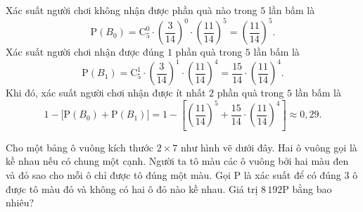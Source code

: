 \begin{ex}
{		Xác suất người chơi không nhận được phần quà nào trong $5$ lần bấm là
		\[\mathrm{P}(B_0) = \mathrm{C}_5^0\cdot \left(\dfrac{3}{14} \right)^0 \cdot \left(\dfrac{11}{14}\right)^5 = \left(\dfrac{11}{14} \right)^5. \]
		Xác suất người chơi nhận được đúng $1$ phần quà trong $5$ lần bấm là
		\[\mathrm{P}(B_1) = \mathrm{C}_5^1\cdot \left(\dfrac{3}{14}\right)^1 \cdot \left(\dfrac{11}{14} \right)^4 = \dfrac{15}{14}\cdot \left(\dfrac{11}{14}\right)^4. \]
		Khi đó, xác suất người chơi nhận được ít nhất $2$ phần quà trong $5$ lần bấm là
		\[1-\big[\mathrm{P}(B_0) + \mathrm{P}(B_1) \big] = 1- \left[\left(\dfrac{11}{14} \right)^5 + \dfrac{15}{14}\cdot \left(\dfrac{11}{14}\right)^4 \right] \approx 0{,}29. \]
	}
\end{ex}

\begin{ex}%
	Cho một bảng ô vuông kích thước $2\times7$ như hình vẽ dưới đây. Hai ô vuông gọi là kề nhau nếu có chung một cạnh. Người ta tô màu các ô vuông bởi hai màu đen và đỏ sao cho mỗi ô chỉ được tô đúng một màu. Gọi $\mathrm{P}$ là xác suất để có đúng 3 ô được tô màu đỏ và không có hai ô đỏ nào kề nhau. Giá trị $8\,192\mathrm{P}$ bằng bao nhiêu?


\end{ex}
